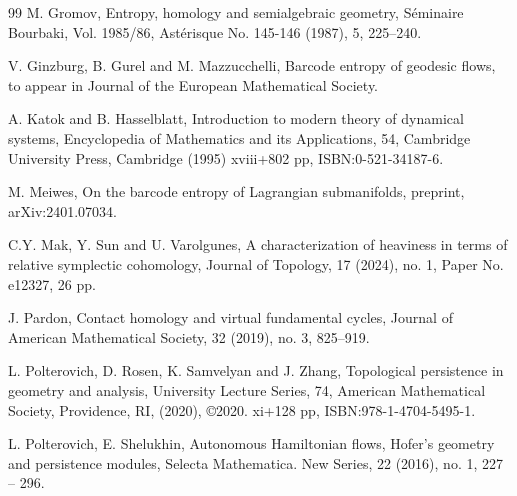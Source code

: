 \documentclass[12pt]{amsart}
\theoremstyle{definition}
\begin{document}
\begin{thebibliography} {99}
 M. Gromov, Entropy, homology and semialgebraic geometry, Séminaire Bourbaki, Vol. 1985/86, Astérisque No. 145-146 (1987), 5, 225–240.



 V. Ginzburg, B. Gurel and M. Mazzucchelli, Barcode entropy of geodesic flows, to appear in Journal of the European Mathematical Society. 

 A. Katok and B. Hasselblatt, Introduction to modern theory of dynamical systems, Encyclopedia of Mathematics and its Applications, 54, Cambridge University Press, Cambridge (1995) xviii+802 pp, ISBN:0-521-34187-6.



 M. Meiwes, On the barcode entropy of Lagrangian submanifolds, preprint, arXiv:2401.07034.

 C.Y. Mak, Y. Sun and U. Varolgunes, A characterization of heaviness in terms of relative symplectic cohomology, Journal of Topology, 17 (2024), no. 1, Paper No. e12327, 26 pp.

 J. Pardon, Contact homology and virtual fundamental cycles, Journal of American Mathematical Society, 32 (2019), no. 3, 825–919.

 L. Polterovich, D. Rosen, K. Samvelyan and J. Zhang, Topological persistence in geometry and analysis, University Lecture Series, 74, American Mathematical Society, Providence, RI, (2020), ©2020. xi+128 pp, ISBN:978-1-4704-5495-1. 

 L. Polterovich, E. Shelukhin, Autonomous Hamiltonian flows, Hofer's geometry and persistence modules, Selecta Mathematica. New Series, 22 (2016), no. 1, 227 – 296.




\end{thebibliography}
\end{document}

